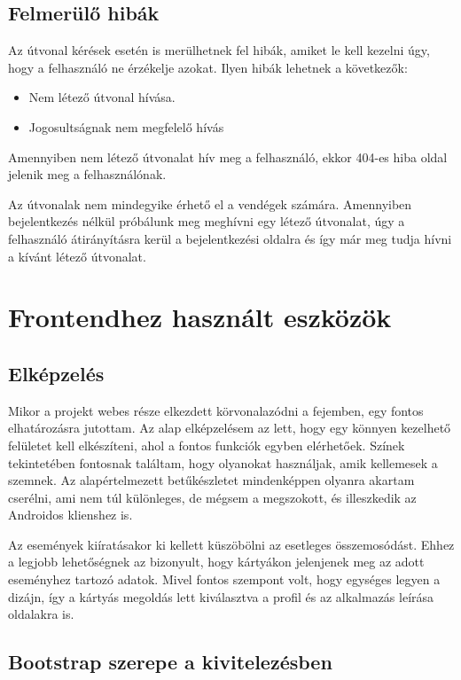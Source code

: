 \documentclass[
]{thesis-ekf}
\theoremstyle{definition}
\theoremstyle{remark}
\begin{document}
	
	
	\subsection{Felmerülő hibák}
	Az útvonal kérések esetén is merülhetnek fel hibák, amiket le kell kezelni úgy, hogy a felhasználó ne érzékelje azokat. Ilyen hibák lehetnek a következők:
	\begin{itemize}
		\item Nem létező útvonal hívása.
		\item Jogosultságnak nem megfelelő hívás
	\end{itemize}
	
	Amennyiben nem létező útvonalat hív meg a felhasználó, ekkor 404-es hiba oldal jelenik meg a felhasználónak. 
	
	Az útvonalak nem mindegyike érhető el a vendégek számára. Amennyiben bejelentkezés nélkül próbálunk meg meghívni egy létező útvonalat, úgy a felhasználó átirányításra kerül a bejelentkezési oldalra és így már meg tudja hívni a kívánt létező útvonalat.
	
	\section{Frontendhez használt eszközök}
	\subsection{Elképzelés}
	Mikor a projekt webes része elkezdett körvonalazódni a fejemben, egy fontos elhatározásra jutottam. Az alap elképzelésem az lett, hogy egy könnyen kezelhető felületet kell elkészíteni, ahol a fontos funkciók egyben elérhetőek. Színek tekintetében fontosnak találtam, hogy olyanokat használjak, amik kellemesek a szemnek. Az alapértelmezett betűkészletet mindenképpen olyanra akartam cserélni, ami nem túl különleges, de mégsem a megszokott, és illeszkedik az Androidos klienshez is.
	
	Az események kiíratásakor ki kellett küszöbölni az esetleges összemosódást. Ehhez a legjobb lehetőségnek az bizonyult, hogy kártyákon jelenjenek meg az adott eseményhez tartozó adatok. Mivel fontos szempont volt, hogy egységes legyen a dizájn, így a kártyás megoldás lett kiválasztva a profil és az alkalmazás leírása oldalakra is. 
	
	\subsection{Bootstrap szerepe a kivitelezésben}
	
\end{document}
